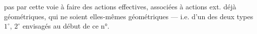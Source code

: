 pas par cette voie à faire des actions  effectives, associées à  actions ext. déjà géométriques, qui ne soient elles-mêmes géométriques --- i.e. d'un des deux types $1^\circ$, $2^\circ$ envisagés au début de ce n°.
